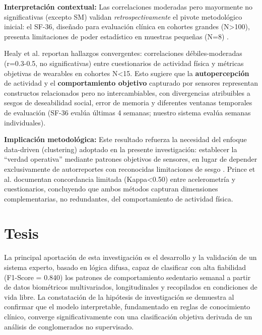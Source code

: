\textbf{Interpretación contextual:} Las correlaciones moderadas pero mayormente no significativas (excepto SM) validan \textit{retrospectivamente} el pivote metodológico inicial: el SF-36, diseñado para evaluación clínica en cohortes grandes (N>100), presenta limitaciones de poder estadístico en muestras pequeñas (N=8) \cite{Healy2024}.

Healy et al. \cite{Healy2024} reportan hallazgos convergentes: correlaciones débiles-moderadas (r=0.3-0.5, no significativas) entre cuestionarios de actividad física y métricas objetivas de wearables en cohortes N<15. Esto sugiere que la \textbf{autopercepción} de actividad y el \textbf{comportamiento objetivo} capturado por sensores representan constructos relacionados pero no intercambiables, con divergencias atribuibles a sesgos de deseabilidad social, error de memoria y diferentes ventanas temporales de evaluación (SF-36 evalúa últimas 4 semanas; nuestro sistema evalúa semanas individuales).

\textbf{Implicación metodológica:} Este resultado refuerza la necesidad del enfoque data-driven (clustering) adoptado en la presente investigación: establecer la ``verdad operativa'' mediante patrones objetivos de sensores, en lugar de depender exclusivamente de autorreportes con reconocidas limitaciones de sesgo \cite{Prince2008}. Prince et al. documentan concordancia limitada (Kappa<0.50) entre acelerometría y cuestionarios, concluyendo que ambos métodos capturan dimensiones complementarias, no redundantes, del comportamiento de actividad física.

\section{Tesis}
\label{sec:tesis}

La principal aportación de esta investigación es el desarrollo y la validación de un sistema experto, basado en lógica difusa, capaz de clasificar con alta fiabilidad (F1-Score = 0.840) los patrones de comportamiento sedentario semanal a partir de datos biométricos multivariados, longitudinales y recopilados en condiciones de vida libre. La constatación de la hipótesis de investigación se demuestra al confirmar que el modelo interpretable, fundamentado en reglas de conocimiento clínico, converge significativamente con una clasificación objetiva derivada de un análisis de conglomerados no supervisado.

